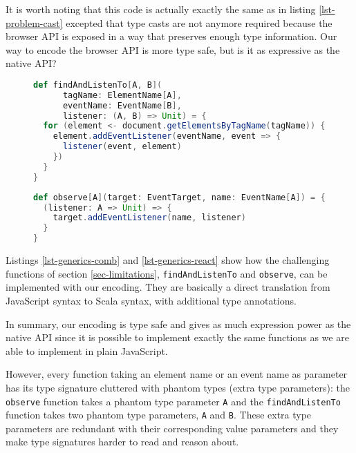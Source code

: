 \documentclass{llncs}
\newcommand{\jscode}[1]{\lstinline[language=JavaScript]|#1|}
\newcommand{\scalacode}[1]{\lstinline[language=Scala]|#1|}
\begin{document}
It is worth noting that this code is actually exactly the same as in listing \ref{lst-problem-cast} excepted that type casts are not anymore required because the browser API is exposed in a way that preserves enough type information. Our way to encode the browser API is more type safe, but is it as expressive as the native API?

\begin{figure}
\begin{lstlisting}[label=lst-generics-comb,language=Scala,caption={Combination of \scalacode{getElementsByTagName} and \scalacode{addEventListener} functions encoded using type parameters}]
def findAndListenTo[A, B](
      tagName: ElementName[A],
      eventName: EventName[B],
      listener: (A, B) => Unit) = {
  for (element <- document.getElementsByTagName(tagName)) {
    element.addEventListener(eventName, event => {
      listener(event, element)
    })
  }
}
\end{lstlisting}
\end{figure}

\begin{figure}
\begin{lstlisting}[label=lst-generics-react,language=Scala,caption={Partial application of \scalacode{addEventListener} encoded with type parameters}]
def observe[A](target: EventTarget, name: EventName[A]) = {
  (listener: A => Unit) => {
    target.addEventListener(name, listener)
  }
}
\end{lstlisting}
\end{figure}

Listings \ref{lst-generics-comb} and \ref{lst-generics-react} show how the challenging functions of section \ref{sec-limitations}, \jscode{findAndListenTo} and \jscode{observe}, can be implemented with our encoding. They are basically a direct translation from JavaScript syntax to Scala syntax, with additional type annotations.

In summary, our encoding is type safe and gives as much expression power as the native API since it is possible to implement exactly the same functions as we are able to implement in plain JavaScript.

However, every function taking an element name or an event name as parameter has its type signature cluttered with phantom types (extra type parameters): the \scalacode{observe} function takes a phantom type parameter \scalacode{A} and the \scalacode{findAndListenTo} function takes two phantom type parameters, \scalacode{A} and \scalacode{B}. These extra type parameters are redundant with their corresponding value parameters and they make type signatures harder to read and reason about.
\end{document}

